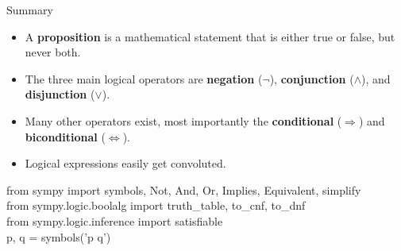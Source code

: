 \documentclass[aspectratio=169]{beamer}
\begin{document}
\begin{frame}[t]{Summary}
  \begin{itemize}\setlength\itemsep{0.6em}
    \item A \textbf{proposition} is a mathematical statement that is either true or false, but never both.
    \item The three main logical operators are
          \textbf{negation} ($\neg$), \textbf{conjunction} ($\wedge$), and \textbf{disjunction} ($\vee$).
    \item Many other operators exist, most importantly the
          \textbf{conditional} ($\Rightarrow$) and \textbf{biconditional} ($\Leftrightarrow$).
    \item Logical expressions easily get convoluted.
  \end{itemize}
  \vspace{0.8em}
  \begin{tcolorbox}[spstyle, title=SymPy --- key imports for this lesson]
    from sympy import symbols, Not, And, Or, Implies, Equivalent,
    simplify\\
    from sympy.logic.boolalg import truth\_table, to\_cnf, to\_dnf\\
    from sympy.logic.inference import satisfiable\\
    p, q = symbols('p q')
  \end{tcolorbox}
\end{frame}
\end{document}

